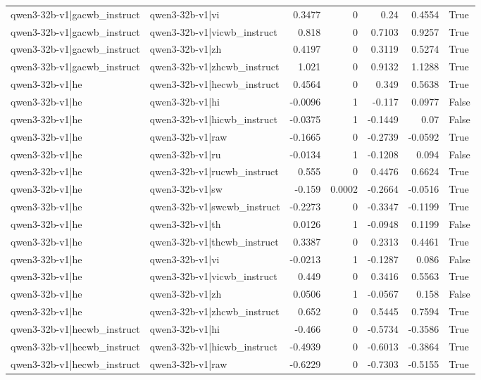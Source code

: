 \begin{table}
\begin{tabular}{l l r r r r l}
qwen3-32b-v1|gacwb_instruct & qwen3-32b-v1|vi & 0.3477 & 0 & 0.24 & 0.4554 & True \\
qwen3-32b-v1|gacwb_instruct & qwen3-32b-v1|vicwb_instruct & 0.818 & 0 & 0.7103 & 0.9257 & True \\
qwen3-32b-v1|gacwb_instruct & qwen3-32b-v1|zh & 0.4197 & 0 & 0.3119 & 0.5274 & True \\
qwen3-32b-v1|gacwb_instruct & qwen3-32b-v1|zhcwb_instruct & 1.021 & 0 & 0.9132 & 1.1288 & True \\
qwen3-32b-v1|he & qwen3-32b-v1|hecwb_instruct & 0.4564 & 0 & 0.349 & 0.5638 & True \\
qwen3-32b-v1|he & qwen3-32b-v1|hi & -0.0096 & 1 & -0.117 & 0.0977 & False \\
qwen3-32b-v1|he & qwen3-32b-v1|hicwb_instruct & -0.0375 & 1 & -0.1449 & 0.07 & False \\
qwen3-32b-v1|he & qwen3-32b-v1|raw & -0.1665 & 0 & -0.2739 & -0.0592 & True \\
qwen3-32b-v1|he & qwen3-32b-v1|ru & -0.0134 & 1 & -0.1208 & 0.094 & False \\
qwen3-32b-v1|he & qwen3-32b-v1|rucwb_instruct & 0.555 & 0 & 0.4476 & 0.6624 & True \\
qwen3-32b-v1|he & qwen3-32b-v1|sw & -0.159 & 0.0002 & -0.2664 & -0.0516 & True \\
qwen3-32b-v1|he & qwen3-32b-v1|swcwb_instruct & -0.2273 & 0 & -0.3347 & -0.1199 & True \\
qwen3-32b-v1|he & qwen3-32b-v1|th & 0.0126 & 1 & -0.0948 & 0.1199 & False \\
qwen3-32b-v1|he & qwen3-32b-v1|thcwb_instruct & 0.3387 & 0 & 0.2313 & 0.4461 & True \\
qwen3-32b-v1|he & qwen3-32b-v1|vi & -0.0213 & 1 & -0.1287 & 0.086 & False \\
qwen3-32b-v1|he & qwen3-32b-v1|vicwb_instruct & 0.449 & 0 & 0.3416 & 0.5563 & True \\
qwen3-32b-v1|he & qwen3-32b-v1|zh & 0.0506 & 1 & -0.0567 & 0.158 & False \\
qwen3-32b-v1|he & qwen3-32b-v1|zhcwb_instruct & 0.652 & 0 & 0.5445 & 0.7594 & True \\
qwen3-32b-v1|hecwb_instruct & qwen3-32b-v1|hi & -0.466 & 0 & -0.5734 & -0.3586 & True \\
qwen3-32b-v1|hecwb_instruct & qwen3-32b-v1|hicwb_instruct & -0.4939 & 0 & -0.6013 & -0.3864 & True \\
qwen3-32b-v1|hecwb_instruct & qwen3-32b-v1|raw & -0.6229 & 0 & -0.7303 & -0.5155 & True \\

\end{tabular}
\end{table}
